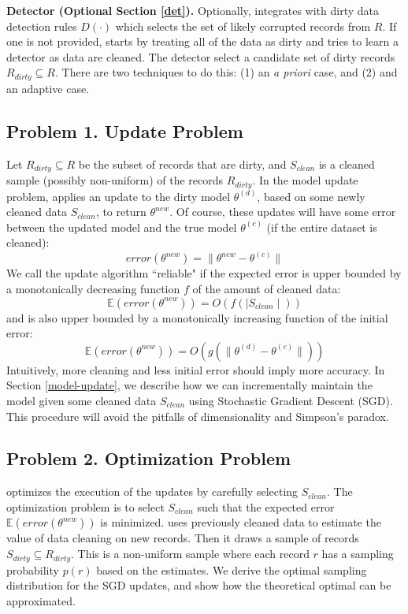 \vspace{0.25em}

\noindent\textbf{Detector (Optional Section \ref{det}). } Optionally, \sys integrates with dirty data detection rules $D(\cdot)$ which selects the set of likely corrupted records from $R$.
If one is not provided, \sys starts by treating all of the data as dirty and tries to learn a detector as data are cleaned.
 The detector select a candidate set of dirty records $R_{dirty} \subseteq R$. There are two techniques to do this: (1) an \emph{a priori} case, and (2) and an adaptive case. 

\subsection{Problem 1. Update Problem}\label{updp}
Let $R_{dirty} \subseteq R$ be the subset of records that are dirty, and $S_{clean}$ is a cleaned sample (possibly non-uniform) of the records $R_{dirty}$.
In the model update problem, \sys applies an update to the dirty model $\theta^{(d)}$, based on some newly cleaned data $S_{clean}$, to return $\theta^{new}$.
Of course, these updates will have some error between the updated model and the true model $\theta^{(c)}$ (if the entire dataset is cleaned):
\[
error(\theta^{new}) = \| \theta^{new} - \theta^{(c)} \|
\]
We call the update algorithm ``reliable" if the expected error is upper bounded by a monotonically decreasing function $f$ of the amount of cleaned data:
\[
\mathbb{E}(error(\theta^{new})) = O(f(\mid S_{clean} \mid))
\]
and is also upper bounded by a monotonically increasing function of the initial error:
\[
\mathbb{E}(error(\theta^{new})) = O(g(\| \theta^{(d)} - \theta^{(c)} \|))
\]
Intuitively, more cleaning and less initial error should imply more accuracy.
In Section \ref{model-update}, we describe how we can incrementally maintain the model given some cleaned data $S_{clean}$ using Stochastic Gradient Descent (SGD).
This procedure will avoid the pitfalls of dimensionality and Simpson's paradox.

\subsection{Problem 2. Optimization Problem}\label{optp}
\sys optimizes the execution of the updates by carefully selecting $S_{clean}$.
The optimization problem is to select $S_{clean}$ such that the expected error $\mathbb{E}(error(\theta^{new}))$ is minimized.
\sys uses previously cleaned data to estimate the value of data cleaning on new records.
Then it draws a sample of records $S_{dirty} \subseteq R_{dirty}$. This is a non-uniform sample where each record $r$ has a sampling probability $p(r)$ based on the estimates.
We derive the optimal sampling distribution for the SGD updates, and show how the theoretical optimal can be approximated.

